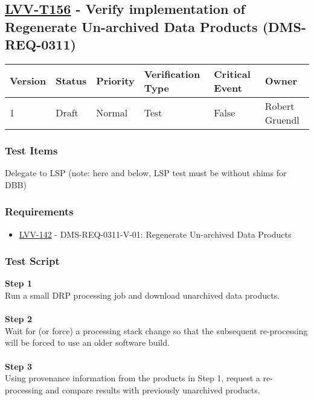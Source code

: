 \hypertarget{lvv-t156---verify-implementation-of-regenerate-un-archived-data-products-dms-req-0311}{%
\subsection{\texorpdfstring{\href{https://jira.lsstcorp.org/secure/Tests.jspa\#/testCase/LVV-T156}{LVV-T156}
- Verify implementation of Regenerate Un-archived Data Products
(DMS-REQ-0311)}{LVV-T156 - Verify implementation of Regenerate Un-archived Data Products (DMS-REQ-0311)}}\label{lvv-t156---verify-implementation-of-regenerate-un-archived-data-products-dms-req-0311}}

\begin{longtable}[]{@{}llllll@{}}
\toprule
Version & Status & Priority & Verification Type & Critical Event &
Owner\tabularnewline
\midrule
\endhead
1 & Draft & Normal & Test & False & Robert Gruendl\tabularnewline
\bottomrule
\end{longtable}

\hypertarget{test-items-132}{%
\subsubsection{Test Items}\label{test-items-132}}

Delegate to LSP (note: here and below, LSP test must be without shims
for DBB)

\hypertarget{requirements-133}{%
\subsubsection{Requirements}\label{requirements-133}}

\begin{itemize}
\tightlist
\item
  \href{https://jira.lsstcorp.org/browse/LVV-142}{LVV-142} -
  DMS-REQ-0311-V-01: Regenerate Un-archived Data Products
\end{itemize}

\hypertarget{test-script-133}{%
\subsubsection{Test Script}\label{test-script-133}}

\textbf{Step 1}\\
Run a small DRP processing job and download unarchived data products.\\
~\\
\textbf{Step 2}\\
Wait for (or force) a processing stack change so that the subsequent
re-processing will be forced to use an older software build.\\
~\\
\textbf{Step 3}\\
Using provenance information from the products in Step 1, request a
re-processing and compare results with previously unarchived products.\\
~\\

